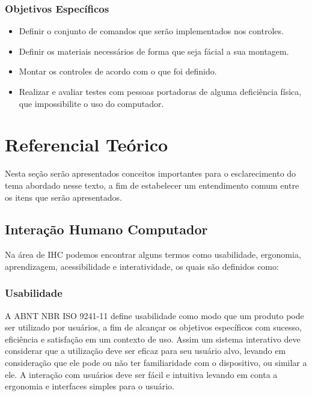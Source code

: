 \documentclass[
	12pt,			%
	openright,		%
	oneside,			%
	a4paper,			%
	chapter=TITLE,		%
	english,			%
	brazil,			%
	]{abntex2}
\begin{document}
\subsection{Objetivos Específicos}
\begin{itemize}
	\item Definir o conjunto de comandos que serão implementados nos controles.
	\item Definir os materiais necessários de forma que seja fácial a sua montagem.
	\item Montar os controles de acordo com o que foi definido.
	\item Realizar e avaliar testes com pessoas portadoras de alguma deficiência física, que impossibilite o uso do computador.
\end{itemize}


\chapter{Referencial Teórico}
\label{refteo}

Nesta seção serão apresentados conceitos importantes para o esclarecimento do tema abordado nesse texto, a fim de estabelecer um entendimento comum entre os itens que serão apresentados.

\section{Interação Humano Computador}

Na área de IHC podemos encontrar alguns termos como usabilidade, ergonomia, aprendizagem, acessibilidade e interatividade, os quais são definidos como:

\subsection{Usabilidade}

A ABNT NBR ISO 9241-11  define usabilidade como modo que um produto pode ser utilizado por usuários, a fim de alcançar os objetivos específicos com sucesso, eficiência e satisfação em um contexto de uso. Assim um sistema interativo deve considerar que a utilização deve ser eficaz para seu usuário alvo, levando em consideração que ele pode ou não ter familiaridade com o dispositivo, ou similar a ele. A interação com usuários deve ser fácil e intuitiva levando em conta a ergonomia e interfaces simples para o usuário.
\end{document}

